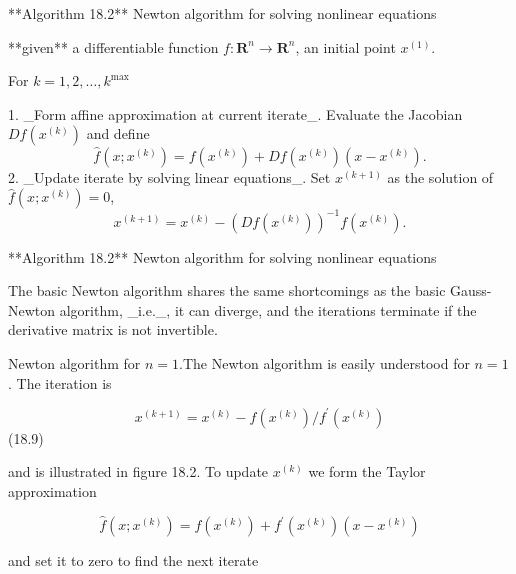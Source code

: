 

**Algorithm 18.2** Newton algorithm for solving nonlinear equations

**given** a differentiable function \(f:\mathbf{R}^{n}\to\mathbf{R}^{n}\), an initial point \(x^{(1)}\).

For \(k=1,2,\ldots,k^{\max}\)

1. _Form affine approximation at current iterate_. Evaluate the Jacobian \(Df(x^{(k)})\) and define \[\hat{f}(x;x^{(k)})=f(x^{(k)})+Df(x^{(k)})(x-x^{(k)}).\]
2. _Update iterate by solving linear equations_. Set \(x^{(k+1)}\) as the solution of \(\hat{f}(x;x^{(k)})=0\), \[x^{(k+1)}=x^{(k)}-\left(Df(x^{(k)})\right)^{-1}f(x^{(k)}).\]

**Algorithm 18.2** Newton algorithm for solving nonlinear equations

The basic Newton algorithm shares the same shortcomings as the basic Gauss-Newton algorithm, _i.e._, it can diverge, and the iterations terminate if the derivative matrix is not invertible.

Newton algorithm for \(n=1\).The Newton algorithm is easily understood for \(n=1\). The iteration is

\[x^{(k+1)}=x^{(k)}-f(x^{(k)})/f^{\prime}(x^{(k)})\] (18.9)

and is illustrated in figure 18.2. To update \(x^{(k)}\) we form the Taylor approximation

\[\hat{f}(x;x^{(k)})=f(x^{(k)})+f^{\prime}(x^{(k)})(x-x^{(k)})\]

and set it to zero to find the next iterate